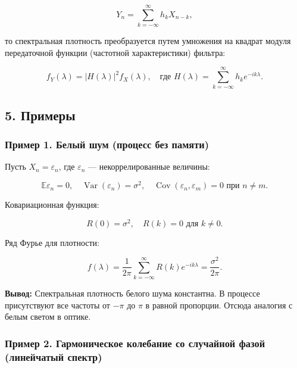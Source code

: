 \documentclass[
  11pt,
  a4paper,
]{article}
\begin{document}
\[
Y_n = \sum_{k=-\infty}^{\infty} h_k X_{n-k},
\]

то спектральная плотность преобразуется путем умножения на квадрат
модуля передаточной функции (частотной характеристики) фильтра:

\[
f_Y(\lambda) = |H(\lambda)|^2 f_X(\lambda), \quad \text{где } H(\lambda) = \sum_{k=-\infty}^{\infty} h_k e^{-i k \lambda}.
\]

\subsection{5. Примеры}\label{ux43fux440ux438ux43cux435ux440ux44b}

\subsubsection{Пример 1. Белый шум (процесс без
памяти)}\label{ux43fux440ux438ux43cux435ux440-1.-ux431ux435ux43bux44bux439-ux448ux443ux43c-ux43fux440ux43eux446ux435ux441ux441-ux431ux435ux437-ux43fux430ux43cux44fux442ux438}

Пусть \(X_n = \varepsilon_n\), где \(\varepsilon_n\) ---
некоррелированные величины:

\[
\mathbb E \varepsilon_n = 0, \quad \operatorname{Var}(\varepsilon_n) = \sigma^2, \quad \operatorname{Cov}(\varepsilon_n, \varepsilon_m) = 0 \text{ при } n \ne m.
\]

Ковариационная функция:

\[
R(0) = \sigma^2, \quad R(k) = 0 \text{ для } k \ne 0.
\]

Ряд Фурье для плотности:

\[
f(\lambda) = \frac{1}{2\pi} \sum_{k=-\infty}^{\infty} R(k) e^{-i k \lambda} = \frac{\sigma^2}{2\pi}.
\]

\textbf{Вывод:} Спектральная плотность белого шума константна. В
процессе присутствуют все частоты от \(-\pi\) до \(\pi\) в равной
пропорции. Отсюда аналогия с белым светом в оптике.

\subsubsection{Пример 2. Гармоническое колебание со случайной фазой
(линейчатый
спектр)}\label{ux43fux440ux438ux43cux435ux440-2.-ux433ux430ux440ux43cux43eux43dux438ux447ux435ux441ux43aux43eux435-ux43aux43eux43bux435ux431ux430ux43dux438ux435-ux441ux43e-ux441ux43bux443ux447ux430ux439ux43dux43eux439-ux444ux430ux437ux43eux439-ux43bux438ux43dux435ux439ux447ux430ux442ux44bux439-ux441ux43fux435ux43aux442ux440}
\end{document}
